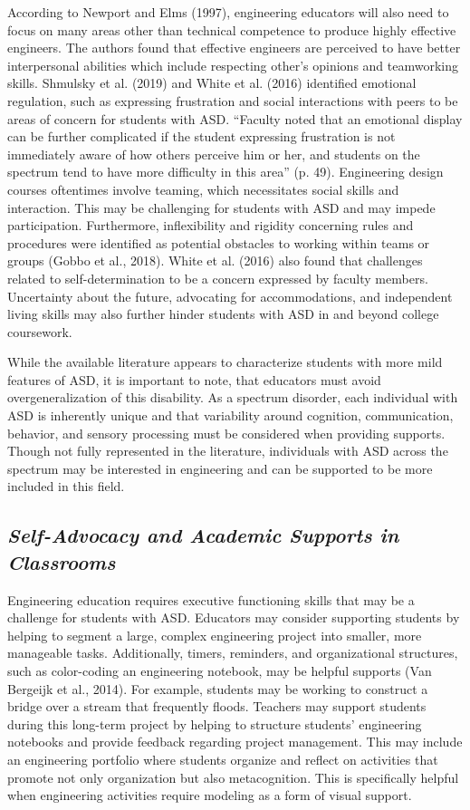 \documentclass[11.5pt]{sig-alternate}
\begin{document}
\begin{large}
According to Newport and Elms (1997), engineering educators will also need to focus on many areas other than technical competence to produce highly effective engineers. The authors found that effective engineers are perceived to have better interpersonal abilities which include respecting other’s opinions and teamworking skills. Shmulsky et al. (2019) and White et al. (2016) identified emotional regulation, such as expressing frustration and social interactions with peers to be areas of concern for students with ASD. “Faculty noted that an emotional display can be further complicated if the student expressing frustration is not immediately aware of how others perceive him or her, and students on the spectrum tend to have more difficulty in this area” (p. 49). Engineering design courses oftentimes involve teaming, which necessitates social skills and interaction. This may be challenging for students with ASD and may impede participation. Furthermore, inflexibility and rigidity concerning rules and procedures were identified as potential obstacles to working within teams or groups (Gobbo et al., 2018). White et al. (2016) also found that challenges related to self-determination to be a concern expressed by faculty members. Uncertainty about the future, advocating for accommodations, and independent living skills may also further hinder students with ASD in and beyond college coursework.

While the available literature appears to characterize students with more mild features of ASD, it is important to note, that educators must avoid overgeneralization of this disability. As a spectrum disorder, each individual with ASD is inherently unique and that variability around cognition, communication, behavior, and sensory processing must be considered when providing supports. Though not fully represented in the literature, individuals with ASD across the spectrum may be interested in engineering and can be supported to be more included in this field.  

\subsection*{\textbf{\textit{Self-Advocacy and Academic Supports in Classrooms}}}

Engineering education requires executive functioning skills that may be a challenge for students with ASD.  Educators may consider supporting students by helping to segment a large, complex engineering project into smaller, more manageable tasks. Additionally, timers, remind\-ers, and organizational structures, such as color-coding an engineering notebook, may be helpful supports (Van Bergeijk et al., 2014). For example, students may be working to construct a bridge over a stream that frequently floods. Teachers may support students during this long-term project by helping to structure students’ engineering notebooks and provide feedback regarding project management. This may include an engineering portfolio where students organize and reflect on activities that promote not only organization but also metacognition. This is specifically helpful when engineering activities require modeling as a form of visual support.


\end{large}
\end{document}
